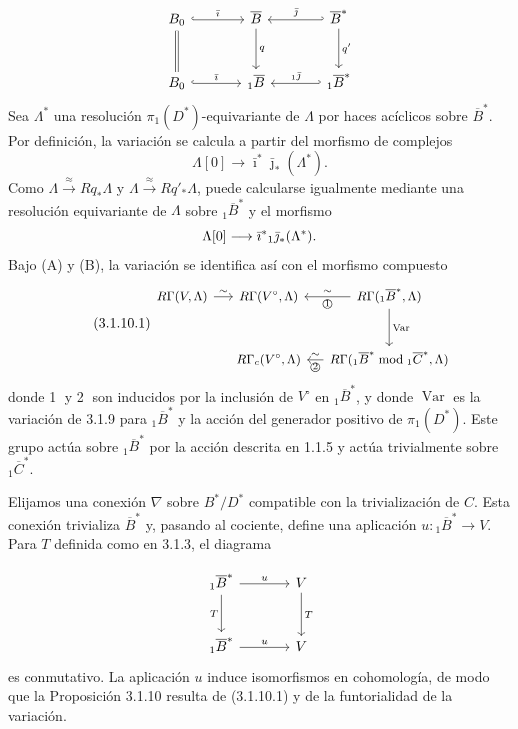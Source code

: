 \[
\begin{tikzcd}[column sep=large,row sep=large]
B_0 \arrow[r,hook,"\bar\imath"] \arrow[d,equal]
  & \overline B \arrow[d,"q"]
  & \overline B^* \arrow[l,hook',"\bar\jmath"'] \arrow[d,"q'"] \\
B_0 \arrow[r,hook,"\bar\imath"]
  & {}_1\overline B
  & {}_1\overline B^* \arrow[l,hook',"{}_1\bar\jmath"']
\end{tikzcd}
\]
Sea $\Lambda^*$ una resolución $\pi_1(D^*)$-equivariante de $\Lambda$
por haces acíclicos sobre $\overline B^*$. Por definición, la variación
se calcula a partir del morfismo de complejos
\[
\Lambda[0]\longrightarrow
\bar\imath^*\bar\jmath_*(\Lambda^*).
\]
Como $\Lambda\xrightarrow{\approx}Rq_*\Lambda$ y
$\Lambda\xrightarrow{\approx}Rq'_*\Lambda$, puede calcularse igualmente
mediante una resolución equivariante de $\Lambda$ sobre
${}_1\overline B^*$ y el morfismo
\[
\Lambda[0]\longrightarrow
\bar\imath^*{}_1\bar\jmath_*(\Lambda^*).
\]
Bajo (A) y (B), la variación se identifica así con el morfismo compuesto
\begin{equation}\tag{3.1.10.1}
\begin{tikzcd}[column sep=small,row sep=large,cells={nodes={font=\small}}]
R\Gamma(V,\Lambda) \arrow[r,"\sim"]
  & R\Gamma(V^\circ,\Lambda)
  & R\Gamma({}_1\overline B^*,\Lambda)
      \arrow[l,"\sim"',"\text{\textcircled{1}}"]
      \arrow[d,"\operatorname{Var}"] \\
{}
  & R\Gamma_c(V^\circ,\Lambda)
  & R\Gamma({}_1\overline B^*\bmod{}_1\overline C^*,\Lambda)
      \arrow[l,"\sim"',"\text{\textcircled{2}}"]
\end{tikzcd}
\end{equation}
donde \textcircled{1} y \textcircled{2} son inducidos por la inclusión
de $V^\circ$ en ${}_1\overline B^*$, y donde $\operatorname{Var}$ es la
variación de 3.1.9 para ${}_1\overline B^*$ y la acción del generador
positivo de $\pi_1(D^*)$. Este grupo actúa sobre ${}_1\overline B^*$ por
la acción descrita en 1.1.5 y actúa trivialmente sobre
${}_1\overline C^*$.

Elijamos una conexión $\nabla$ sobre $B^*/D^*$ compatible con la
trivialización de $C$. Esta conexión trivializa $\overline B^*$ y,
pasando al cociente, define una aplicación
$u:{}_1\overline B^*\to V$. Para $T$ definida como en 3.1.3, el diagrama

\pageoriginale

\[
\begin{tikzcd}[column sep=large,row sep=large]
{}_1\overline B^* \arrow[r,"u"] \arrow[d,"T"']
  & V \arrow[d,"T"] \\
{}_1\overline B^* \arrow[r,"u"]
  & V
\end{tikzcd}
\]
es conmutativo. La aplicación $u$ induce isomorfismos en cohomología, de
modo que la Proposición 3.1.10 resulta de (3.1.10.1) y de la funtorialidad
de la variación.

